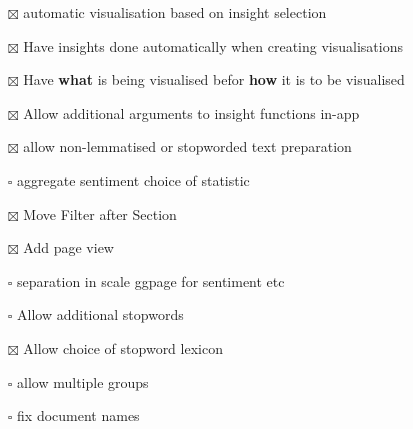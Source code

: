 \documentclass[a4paper, 11pt]{article}
\begin{document}
\begin{itemize}
\item[{$\boxtimes$}] automatic visualisation based on insight selection
\item[{$\boxtimes$}] Have insights done automatically when creating visualisations
\item[{$\boxtimes$}] Have \textbf{what} is being visualised befor \textbf{how} it is to be visualised
\item[{$\boxtimes$}] Allow additional arguments to insight functions in-app
\item[{$\boxtimes$}] allow non-lemmatised or stopworded text preparation
\item[{$\square$}] aggregate sentiment choice of statistic
\item[{$\boxtimes$}] Move Filter after Section
\item[{$\boxtimes$}] Add page view
\item[{$\square$}] separation in scale ggpage for sentiment etc
\item[{$\square$}] Allow additional stopwords
\item[{$\boxtimes$}] Allow choice of stopword lexicon
\item[{$\square$}] allow multiple groups
\item[{$\square$}] fix document names
\end{itemize}
\end{document}
